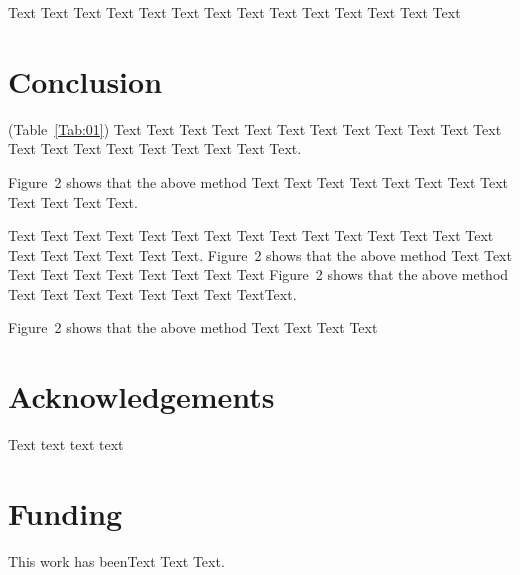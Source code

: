 \documentclass{bioinfo}
\begin{document}
Text Text Text Text Text Text  Text Text Text Text Text Text Text
Text


\section{Conclusion}

(Table~\ref{Tab:01}) Text Text Text Text Text Text  Text Text Text
Text Text Text Text Text Text  Text Text Text Text Text Text.

Figure~2\vphantom{\ref{fig:02}} shows that the above method  Text
Text Text Text  Text Text Text Text Text Text  Text Text.

Text Text Text Text Text Text Text Text Text Text Text Text Text
Text Text Text Text Text Text Text Text.
Figure~2\vphantom{\ref{fig:02}} shows\vadjust{\pagebreak} that the
above method  Text Text Text Text Text Text Text Text Text Text
Figure~2\vphantom{\ref{fig:02}} shows that the above method  Text
Text Text Text Text Text Text Text\break Text.

Figure~2\vphantom{\ref{fig:02}} shows that the above method  Text
Text Text Text\vspace*{-10pt}


\section*{Acknowledgements}

Text
text text text\vspace*{-12pt}

\section*{Funding}

This work has beenText  Text Text.\vspace*{-12pt}


%
%
%
%
%
%
%

\end{document}
